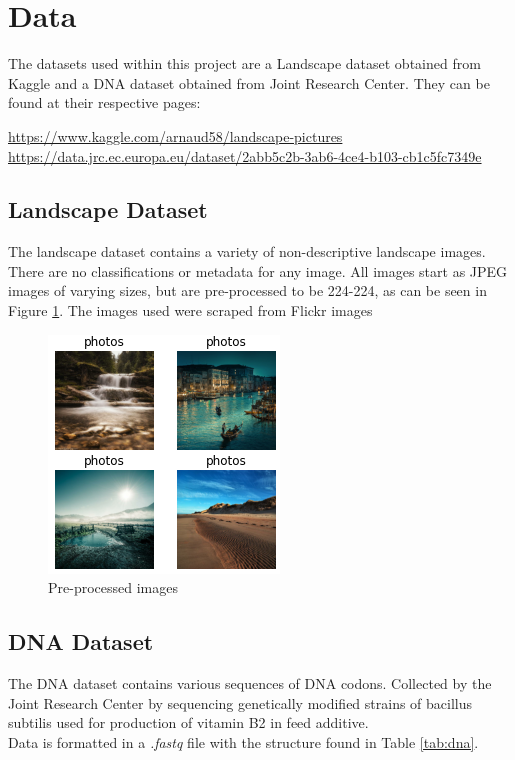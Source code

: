 \documentclass{article}
\begin{document}
	
	\section{Data}
	\label{sec:data}
	The datasets used within this project are a Landscape dataset obtained from Kaggle and a DNA dataset obtained from Joint Research Center. They can be found at their respective pages:
	\begin{center}
		\url{https://www.kaggle.com/arnaud58/landscape-pictures} \\
		\url{https://data.jrc.ec.europa.eu/dataset/2abb5c2b-3ab6-4ce4-b103-cb1c5fc7349e}
	\end{center}

	\subsection{Landscape Dataset}
	The landscape dataset contains a variety of non-descriptive landscape images. There are no classifications or metadata for any image. All images start as JPEG images of varying sizes, but are pre-processed to be 224-224, as can be seen in Figure \ref{fig:landscapes}. The images used were scraped from Flickr images
	
	\begin{figure}[h]
		\centering
		\includegraphics[scale=1]{images/landscapes}
		\caption{Pre-processed images}
		\label{fig:landscapes}
	\end{figure}

	
	\subsection{DNA Dataset}
	The DNA dataset contains various sequences of DNA codons. Collected by the Joint Research Center by sequencing genetically modified strains of bacillus subtilis used for production of vitamin B2 in feed additive. \\
	Data is formatted in a {\em .fastq} file with the structure found in Table \ref{tab:dna}.
	
\end{document}
